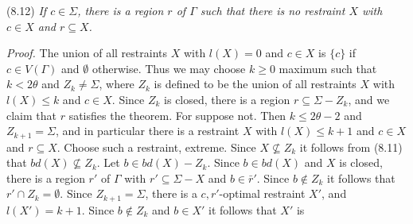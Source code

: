 \stmt
(8.12) \textit{If $c \in \Sigma$, there is a region $r$ of $\Gamma$ such that there is no restraint $X$ with $c \in X$ and $r \subseteq X$.}

\textit{Proof.} The union of all restraints $X$ with $l(X) = 0$ and $c \in X$ is $\{c\}$ if $c \in V(\Gamma)$ and $\emptyset$ otherwise. Thus we may choose $k \ge 0$ maximum such that $k < 2\theta$ and $Z_k \ne \Sigma$, where $Z_k$ is defined to be the union of all restraints $X$ with $l(X) \le k$ and $c \in X$. Since $Z_k$ is closed, there is a region $r \subseteq \Sigma - Z_k$, and we claim that $r$ satisfies the theorem. For suppose not. Then $k \le 2\theta - 2$ and $Z_{k+1} = \Sigma$, and in particular there is a restraint $X$ with $l(X) \le k+1$ and $c \in X$ and $r \subseteq X$. Choose such a restraint, extreme. Since $X \nsubseteq Z_k$ it follows from (8.11) that $bd(X) \nsubseteq Z_k$. Let $b \in bd(X) - Z_k$. Since $b \in bd(X)$ and $X$ is closed, there is a region $r'$ of $\Gamma$ with $r' \subseteq \Sigma - X$ and $b \in \bar{r}'$. Since $b \notin Z_k$ it follows that $r' \cap Z_k = \emptyset$. Since $Z_{k+1} = \Sigma$, there is a $c, r'$-optimal restraint $X'$, and $l(X') = k+1$. Since $b \notin Z_k$ and $b \in X'$ it follows that $X'$ is
